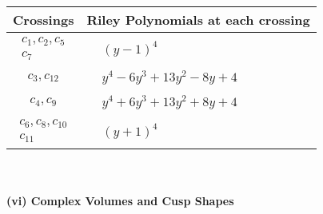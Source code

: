 \documentclass[1p]{elsarticle_modified}
\theoremstyle{definition}
\begin{document}
\begin{tabular}{m{50pt}|m{274pt}}
Crossings & \hspace{64pt}Riley Polynomials at each crossing \\
\hline $$\begin{aligned}c_{1},c_{2},c_{5}\\c_{7}\end{aligned}$$&$\begin{aligned}
&(y-1)^4
\end{aligned}$\\
\hline $$\begin{aligned}c_{3},c_{12}\end{aligned}$$&$\begin{aligned}
&y^4-6 y^3+13 y^2-8 y+4
\end{aligned}$\\
\hline $$\begin{aligned}c_{4},c_{9}\end{aligned}$$&$\begin{aligned}
&y^4+6 y^3+13 y^2+8 y+4
\end{aligned}$\\
\hline $$\begin{aligned}c_{6},c_{8},c_{10}\\c_{11}\end{aligned}$$&$\begin{aligned}
&(y+1)^4
\end{aligned}$\\
\hline
\end{tabular}\\~\\
\newpage\flushleft \textbf{(vi) Complex Volumes and Cusp Shapes}
\end{document}
